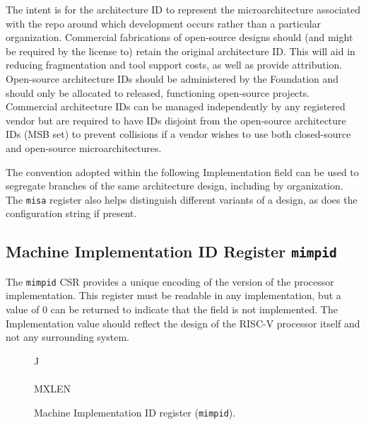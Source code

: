 \begin{commentary}
The intent is for the architecture ID to represent the
microarchitecture associated with the repo around which development
occurs rather than a particular organization.  Commercial fabrications
of open-source designs should (and might be required by the license
to) retain the original architecture ID.  This will aid in reducing
fragmentation and tool support costs, as well as provide attribution.
Open-source architecture IDs should be administered by the Foundation
and should only be allocated to released, functioning open-source
projects.  Commercial architecture IDs can be managed independently by
any registered vendor but are required to have IDs disjoint from the
open-source architecture IDs (MSB set) to prevent collisions if a
vendor wishes to use both closed-source and open-source
microarchitectures.

The convention adopted within the following Implementation field can
be used to segregate branches of the same architecture design,
including by organization.  The {\tt misa} register also helps
distinguish different variants of a design, as does the configuration
string if present.
\end{commentary}

\subsection{Machine Implementation ID Register {\tt mimpid}}

The {\tt mimpid} CSR provides a unique encoding of the version of the
processor implementation.  This register must be readable in any
implementation, but a value of 0 can be returned to indicate that the
field is not implemented.  The Implementation value should reflect the
design of the RISC-V processor itself and not any surrounding system.

\begin{figure*}[h!]
{\footnotesize
\begin{center}
\begin{tabular}{J}
 \\
\hline
{}  \\
\hline
MXLEN \\
\end{tabular}
\end{center}
}
\vspace{-0.1in}
\caption{Machine Implementation ID register ({\tt mimpid}).}
\label{mimpidreg}
\end{figure*}

